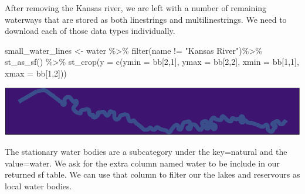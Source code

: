 \documentclass[
  paper=a4,
  ,captions=tableheading
]{scrartcl}
\newenvironment{Shaded}{\begin{snugshade}}{\end{snugshade}}
\newcommand{\AttributeTok}[1]{\textcolor[rgb]{0.77,0.63,0.00}{#1}}
\newcommand{\DecValTok}[1]{\textcolor[rgb]{0.00,0.00,0.81}{#1}}
\newcommand{\FunctionTok}[1]{\textcolor[rgb]{0.00,0.00,0.00}{#1}}
\newcommand{\NormalTok}[1]{#1}
\newcommand{\OtherTok}[1]{\textcolor[rgb]{0.56,0.35,0.01}{#1}}
\newcommand{\SpecialCharTok}[1]{\textcolor[rgb]{0.00,0.00,0.00}{#1}}
\newcommand{\StringTok}[1]{\textcolor[rgb]{0.31,0.60,0.02}{#1}}
\begin{document}
After removing the Kansas river, we are left with a number of remaining
waterways that are stored as both linestrings and multilinestrings. We
need to download each of those data types individually.

\begin{Shaded}
\begin{Highlighting}[]
\NormalTok{small\_water\_lines }\OtherTok{\textless{}{-}}\NormalTok{ water }\SpecialCharTok{\%\textgreater{}\%}
  \FunctionTok{filter}\NormalTok{(name }\SpecialCharTok{!=} \StringTok{"Kansas River"}\NormalTok{)}\SpecialCharTok{\%\textgreater{}\%}
  \FunctionTok{st\_as\_sf}\NormalTok{() }\SpecialCharTok{\%\textgreater{}\%}
  \FunctionTok{st\_crop}\NormalTok{(}\AttributeTok{y =} \FunctionTok{c}\NormalTok{(}\AttributeTok{ymin =}\NormalTok{ bb[}\DecValTok{2}\NormalTok{,}\DecValTok{1}\NormalTok{], }\AttributeTok{ymax =}\NormalTok{ bb[}\DecValTok{2}\NormalTok{,}\DecValTok{2}\NormalTok{], }\AttributeTok{xmin =}\NormalTok{ bb[}\DecValTok{1}\NormalTok{,}\DecValTok{1}\NormalTok{], }\AttributeTok{xmax =}\NormalTok{ bb[}\DecValTok{1}\NormalTok{,}\DecValTok{2}\NormalTok{]))}
\end{Highlighting}
\end{Shaded}

\includegraphics{Haskell_files/figure-latex/unnamed-chunk-26-1.pdf}

The stationary water bodies are a subcategory under the key=natural and
the value=water. We ask for the extra column named water to be include
in our returned sf table. We can use that column to filter our the lakes
and reservours as local water bodies.
\end{document}
